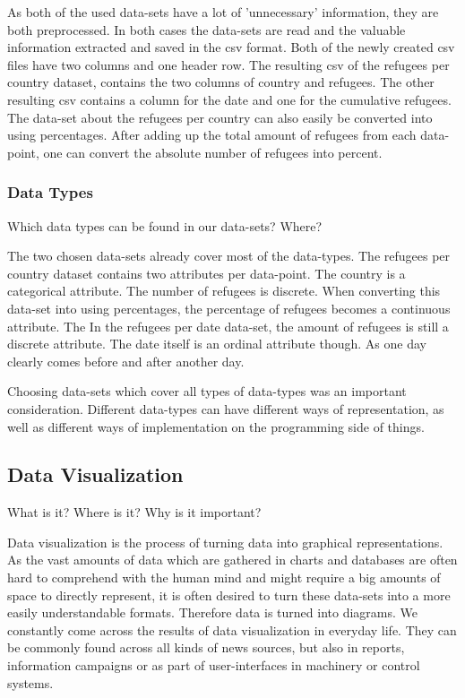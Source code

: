 As both of the used data-sets have a lot of 'unnecessary' information, they are both preprocessed. In both cases the data-sets are read and the valuable information extracted and saved in the csv format. Both of the newly created csv files have two columns and one header row. The resulting csv of the refugees per country dataset, contains the two columns of country and refugees. The other resulting csv contains a column for the date and one for the cumulative refugees.
The data-set about the refugees per country can also easily be converted into using percentages. After adding up the total amount of refugees from each data-point, one can convert the absolute number of refugees into percent.

\subsubsection{Data Types}
Which data types can be found in our data-sets? Where?

The two chosen data-sets already cover most of the data-types. The refugees per country dataset contains two attributes per data-point. The country is a categorical attribute. The number of refugees is discrete. When converting this data-set into using percentages, the percentage of refugees becomes a continuous attribute. The In the refugees per date data-set, the amount of refugees is still a discrete attribute. The date itself is an ordinal attribute though. As one day clearly comes before and after another day.

Choosing data-sets which cover all types of data-types was an important consideration. Different data-types can have different ways of representation, as well as different ways of implementation on the programming side of things.


\subsection{Data Visualization}
What is it? Where is it? Why is it important?

Data visualization is the process of turning data into graphical representations. As the vast amounts of data which are gathered in charts and databases are often hard to comprehend with the human mind and might require a big amounts of space to directly represent, it is often desired to turn these data-sets into a more easily understandable formats. Therefore data is turned into diagrams. We constantly come across the results of data visualization in everyday life. They can be commonly found across all kinds of news sources, but also in reports, information campaigns or as part of user-interfaces in machinery or control systems. 


